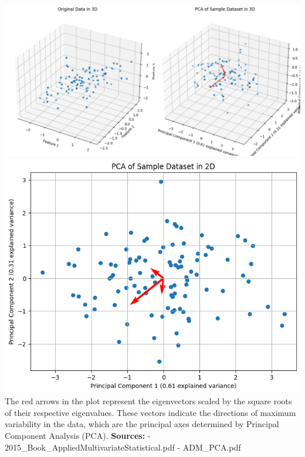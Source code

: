 \includegraphics{images/pca_3d.png} \includegraphics{images/pca_2d.png}
The red arrows in the plot represent the eigenvectors scaled by the
square roots of their respective eigenvalues. These vectors indicate the
directions of maximum variability in the data, which are the principal
axes determined by Principal Component Analysis (PCA). \textbf{Sources:}
- 2015\_Book\_AppliedMultivariateStatistical.pdf - ADM\_PCA.pdf
